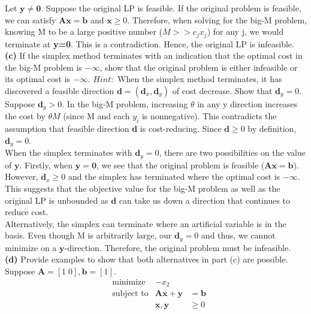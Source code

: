 \documentclass{article}
\begin{document}
\noindent
Let $\mathbf{y \neq 0}$.  Suppose the original LP is feasible.  If the original problem is feasible, we can satisfy $\mathbf{Ax=b}$ and $\mathbf{x} \geq 0$.  Therefore, when solving for the big-M problem, knowing M to be a large positive number ($M >> c_j x_j$) for any j, we would terminate at \textbf{y=0}.  This is a contradiction.  Hence, the original LP is infeasible.\\

\noindent
\textbf{(c)} If the simplex method terminates with an indication that the optimal cost in the big-M problem is $-\infty$, show that the original problem is either infeasible or its optimal cost is $-\infty$.  $Hint:$ When the simplex method terminates, it has discovered a feasible direction $\mathbf{d} = (\mathbf{d}_x, \mathbf{d}_y)$ of cost decrease.  Show that $\mathbf{d}_y = 0$. \\

\noindent
Suppose $\mathbf{d}_y > 0$.  In the big-M problem, increasing $\theta$ in any y direction increases the cost by $\theta M$ (since M and each $y_i$ is nonnegative).  This contradicts the assumption that feasible direction \textbf{d} is cost-reducing.  Since $\mathbf{d} \geq 0$ by definition, $\mathbf{d}_y = 0$.  \\

\noindent 
When the simplex terminates with $\mathbf{d}_y = 0$, there are two possibilities on the value of $\mathbf{y}$.  Firstly, when $\mathbf{y=0}$, we see that the original problem is feasible ($\mathbf{Ax=b}$).  However, $\mathbf{d}_x \geq 0$ and the simplex has terminated where the optimal cost is $-\infty$.  This suggests that the objective value for the big-M problem as well as the original LP is unbounded as $\mathbf{d}$ can take us down a direction that continues to reduce cost.\\

\noindent
Alternatively, the simplex can terminate where an artificial variable is in the basis.  Even though M is arbitrarily large, our $\mathbf{d}_y=0$ and thus, we cannot minimize on a $\mathbf{y}$-direction.  Therefore, the original problem must be infeasible. \\

\noindent
\textbf{(d)} Provide examples to show that both alternatives in part (c) are possible.\\

Suppose $\mathbf{A} = [1 \; 0], \mathbf{b} = [1]$.
\noindent
\begin{equation*}
\begin{aligned}
& \text{minimize} & -x_2 & \\
& \text{subject to} & \mathbf{Ax + y} & = \mathbf{b}  \\
&					& \mathbf{x,y} & \geq 0 
\end{aligned}
\end{equation*}
\end{document}
